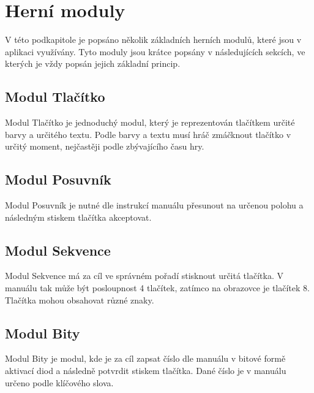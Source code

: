 \section{Herní moduly}

V této podkapitole je popsáno několik základních herních modulů,
které jsou v aplikaci využívány.
Tyto moduly jsou krátce popsány v následujících sekcích,
ve kterých je vždy popsán jejich základní princip.

\subsection{Modul Tlačítko}

Modul Tlačítko je jednoduchý modul,
který je reprezentován tlačítkem určité barvy a určitého textu.
Podle barvy a textu musí hráč zmáčknout tlačítko v určitý moment,
nejčastěji podle zbývajícího času hry.

\subsection{Modul Posuvník}

Modul Posuvník je nutné dle instrukcí manuálu přesunout na určenou polohu
a následným stiskem tlačítka akceptovat.

\subsection{Modul Sekvence}

Modul Sekvence má za cíl ve správném pořadí stisknout určitá tlačítka.
V manuálu tak může být posloupnost 4 tlačítek,
zatímco na obrazovce je tlačítek 8.
Tlačítka mohou obsahovat různé znaky.

\subsection{Modul Bity}

Modul Bity je modul,
kde je za cíl zapsat číslo dle manuálu v bitové formě aktivací diod
a následně potvrdit stiskem tlačítka.
Dané číslo je v manuálu určeno podle klíčového slova.
